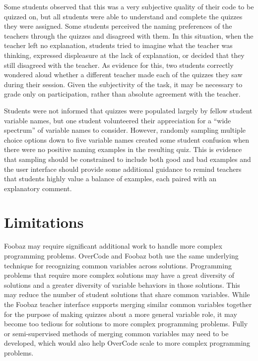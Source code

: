 Some students observed that this was a very subjective quality of their code to be quizzed on, but all students were able to understand and complete the quizzes they were assigned. Some students perceived the naming preferences of the teachers through the quizzes and disagreed with them. In this situation, when the teacher left no explanation, students tried to imagine what the teacher was thinking, expressed displeasure at the lack of explanation, or decided that they still disagreed with the teacher. As evidence for this, two students correctly wondered aloud whether a different teacher made each of the quizzes they saw during their session. Given the subjectivity of the task, it may be necessary to grade only on participation, rather than absolute agreement with the teacher.

Students were not informed that quizzes were populated largely by fellow student variable names, but one student volunteered their appreciation for a ``wide spectrum'' of variable names to consider. However, randomly sampling multiple choice options down to five variable names created some student confusion when there were no positive naming examples in the resulting quiz. This is evidence that sampling should be constrained to include both good and bad examples and the user interface should provide some additional guidance to remind teachers that students highly value a balance of examples, each paired with an explanatory comment.



\section{Limitations}

Foobaz may require significant additional work to handle more complex programming problems. OverCode and Foobaz both use the same underlying technique for recognizing common variables across solutions. Programming problems that require more complex solutions may have a great diversity of solutions and a greater diversity of variable behaviors in those solutions. This may reduce the number of student solutions that share common variables. While the Foobaz teacher interface supports merging similar common variables together for the purpose of making quizzes about a more general variable role, it may become too tedious for solutions to more complex programming problems. Fully or semi-supervised methods of merging common variables may need to be developed, which would also help OverCode scale to more complex programming problems.


